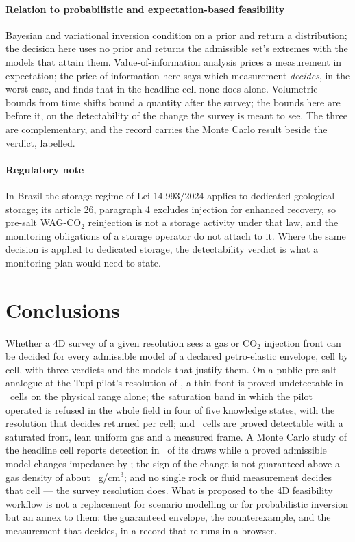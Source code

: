 \documentclass[preprint,11pt,authoryear]{elsarticle}
\begin{document}
\paragraph{Relation to probabilistic and expectation-based feasibility}
Bayesian and variational inversion \citep{grana2022,zhang2023} condition on a prior and return a distribution; the decision here uses no prior and returns the admissible set's extremes with the models that attain them. Value-of-information analysis \citep{anyosa2021} prices a measurement in expectation; the price of information here says which measurement \emph{decides}, in the worst case, and finds that in the headline cell none does alone. Volumetric bounds from time shifts \citep{bergmann2015} bound a quantity after the survey; the bounds here are before it, on the detectability of the change the survey is meant to see. The three are complementary, and the record carries the Monte Carlo result beside the verdict, labelled.

\paragraph{Regulatory note}
In Brazil the storage regime of Lei 14.993/2024 applies to dedicated geological storage; its article 26, paragraph 4 excludes injection for enhanced recovery, so pre-salt WAG-CO$_2$ reinjection is not a storage activity under that law, and the monitoring obligations of a storage operator do not attach to it. Where the same decision is applied to dedicated storage, the detectability verdict is what a monitoring plan would need to state.

\section{Conclusions}\label{sec:conclusions}
Whether a 4D survey of a given resolution sees a gas or CO$_2$ injection front can be decided for every admissible model of a declared petro-elastic envelope, cell by cell, with three verdicts and the models that justify them. On a public pre-salt analogue at the Tupi pilot's resolution of \DTheta, a thin front is proved undetectable in \DThinRefutedZero\ cells on the physical range alone; the saturation band in which the pilot operated is refused in the whole field in four of five knowledge states, with the resolution that decides returned per cell; and \DDetFour\ cells are proved detectable with a saturated front, lean uniform gas and a measured frame. A Monte Carlo study of the headline cell reports detection in \DMcFourTenKP\ of its draws while a proved admissible model changes impedance by \DKFourAttLo; the sign of the change is not guaranteed above a gas density of about \DSignMedian\ g/cm$^3$; and no single rock or fluid measurement decides that cell --- the survey resolution does. What is proposed to the 4D feasibility workflow is not a replacement for scenario modelling or for probabilistic inversion but an annex to them: the guaranteed envelope, the counterexample, and the measurement that decides, in a record that re-runs in a browser.
\end{document}
